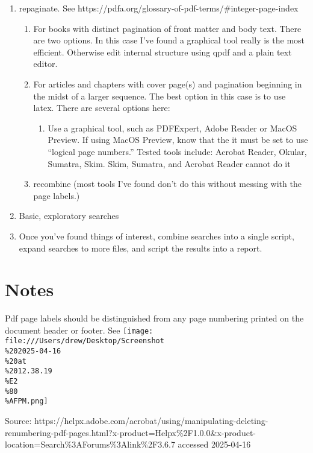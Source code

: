 \documentclass[
  letterpaper,
]{tufte-handout}
\providecommand{\tightlist}{%
  \setlength{\itemsep}{0pt}\setlength{\parskip}{0pt}}
\begin{document}
\begin{enumerate}
\def\labelenumi{\arabic{enumi}.}
\setcounter{enumi}{2}
\tightlist
\item
  repaginate. See
  https://pdfa.org/glossary-of-pdf-terms/\#integer-page-index

  \begin{enumerate}
  \def\labelenumii{\arabic{enumii}.}
  \setcounter{enumii}{3}
  \tightlist
  \item
    For books with distinct pagination of front matter and body text.
    There are two options. In this case I've found a graphical tool
    really is the most efficient. Otherwise edit internal structure
    using qpdf and a plain text editor.
  \item
    For articles and chapters with cover page(s) and pagination
    beginning in the midst of a larger sequence. The best option in this
    case is to use latex. There are several options here:

    \begin{enumerate}
    \def\labelenumiii{\arabic{enumiii}.}
    \tightlist
    \item
      Use a graphical tool, such as PDFExpert, Adobe Reader or MacOS
      Preview. If using MacOS Preview, know that the it must be set to
      use ``logical page numbers.'' Tested tools include: Acrobat
      Reader, Okular, Sumatra, Skim. Skim, Sumatra, and Acrobat Reader
      cannot do it
    \end{enumerate}
  \item
    recombine (most tools I've found don't do this without messing with
    the page labels.)
  \end{enumerate}
\item
  Basic, exploratory searches
\item
  Once you've found things of interest, combine searches into a single
  script, expand searches to more files, and script the results into a
  report.
\end{enumerate}

\section{Notes}\label{notes}

Pdf page labels should be distinguished from any page numbering printed
on the document header or footer. See
\texttt{[image: file:///Users/drew/Desktop/Screenshot\\\%202025-04-16\\\%20at\\\%2012.38.19\\\%E2\\\%80\\\%AFPM.png]}

Source:
https://helpx.adobe.com/acrobat/using/manipulating-deleting-renumbering-pdf-pages.html?x-product=Helpx\%2F1.0.0\&x-product-location=Search\%3AForums\%3Alink\%2F3.6.7
accessed 2025-04-16
\end{document}
